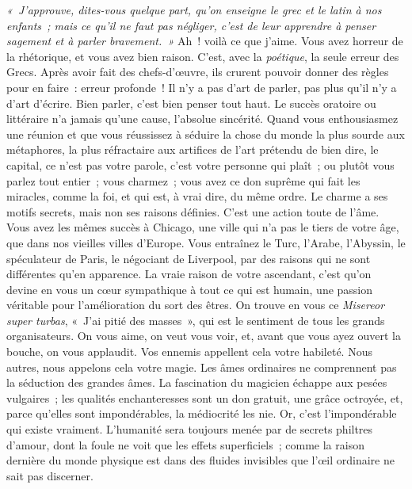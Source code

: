 \documentclass[french,twoside]{book} %
\newcommand\orgName[1]{#1}
\newcommand\placeName[1]{#1}
\begin{document}
\emph{« J’approuve, dites-vous quelque part, qu’on enseigne le grec et le latin à nos enfants ; mais ce qu’il ne faut pas négliger, c’est de leur apprendre à penser sagement et à parler bravement. »} Ah ! voilà ce que j’aime. Vous avez horreur de la rhétorique, et vous avez bien raison. C’est, avec la {\itshape poétique}, la seule erreur des {\orgName Grecs}. Après avoir fait des chefs-d’œuvre, ils crurent pouvoir donner des règles pour en faire : erreur profonde ! Il n’y a pas d’art de parler, pas plus qu’il n’y a d’art d’écrire. Bien parler, c’est bien penser tout haut. Le succès oratoire ou littéraire n’a jamais qu’une cause, l’absolue sincérité. Quand vous enthousiasmez une réunion et que vous réussissez à séduire la chose du monde la plus sourde aux métaphores, la plus réfractaire aux artifices de l’art prétendu de bien dire, le capital, ce n’est pas votre parole, c’est votre personne qui plaît ; ou plutôt vous parlez tout entier ; vous charmez ; vous avez ce don suprême qui fait les miracles, comme la foi, et qui est, à vrai dire, du même ordre. Le charme a ses motifs secrets, mais non ses raisons définies. C’est une action toute de l’âme. Vous avez les mêmes succès à {\placeName Chicago}, une ville qui n’a pas le tiers de votre âge, que dans nos vieilles villes d’{\placeName Europe}. Vous entraînez le Turc, l’Arabe, l’Abyssin, le spéculateur de {\placeName Paris}, le négociant de {\placeName Liverpool}, par des raisons qui ne sont différentes qu’en apparence. La vraie raison de votre ascendant, c’est qu’on devine en vous un cœur sympathique à tout ce qui est humain, une passion véritable pour l’amélioration du sort des êtres. On trouve en vous ce \emph{Misereor super turbas}, « J’ai pitié des masses », qui est le sentiment de tous les grands organisateurs. On vous aime, on veut vous voir, et, avant que vous ayez ouvert la bouche, on vous applaudit. Vos ennemis appellent cela votre habileté. Nous autres, nous appelons cela votre magie. Les âmes ordinaires ne comprennent pas la séduction des grandes âmes. La fascination du magicien échappe aux pesées vulgaires ; les qualités enchanteresses sont un don gratuit, une grâce octroyée, et, parce qu’elles sont impondérables, la médiocrité les nie. Or, c’est l’impondérable qui existe vraiment. L’humanité sera toujours menée par de secrets philtres d’amour, dont la foule ne voit que les effets superficiels ; comme la raison dernière du monde physique est dans des fluides invisibles que l’œil ordinaire ne sait pas discerner.\par
\end{document}
